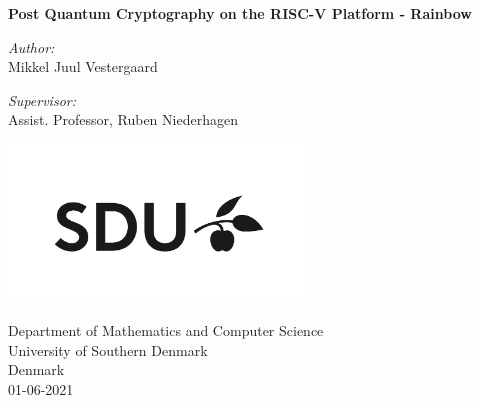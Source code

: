 \documentclass[11pt,a4paper]{article}       		%
\begin{document}

    \begin{titlepage}
    \begin{center}
        \vspace*{1cm}
            
        \LARGE
        \textbf{Post Quantum Cryptography on the RISC-V Platform - Rainbow}
            
        \vspace{2cm}
        
        \Large
        \emph{Author:}\\
        Mikkel Juul Vestergaard
        
        \vspace{0.5cm}
        \emph{Supervisor:}\\
        Assist. Professor, Ruben Niederhagen
        \vfill
        
        \vspace{0.8cm}
            
        \includegraphics[width=0.6\textwidth]{resources/SDU.jpeg}
            
        \Large
        Department of Mathematics and Computer Science\\
        University of Southern Denmark\\
        Denmark\\
        01-06-2021
            
    \end{center}
\end{titlepage}
\end{document}
